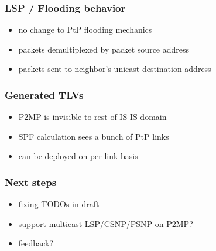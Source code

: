 \documentclass[12pt]{beamer}
\begin{document}
\begin{frame}
  \frametitle{LSP / Flooding behavior}

  \begin{itemize}
    \item {\Large no change to PtP flooding mechanics}
    \item packets demultiplexed by packet source address
    \item packets sent to neighbor's unicast destination address
  \end{itemize}
\end{frame}

\begin{frame}
  \frametitle{Generated TLVs}

  \begin{itemize}
    \item {\Large P2MP is invisible to rest of IS-IS domain}
    \item SPF calculation sees a bunch of PtP links
    \item can be deployed on per-link basis
  \end{itemize}
\end{frame}

\begin{frame}
  \frametitle{Next steps}
  \begin{itemize}
    \item fixing TODOs in draft
    \item support multicast LSP/CSNP/PSNP on P2MP?
    \item feedback?
  \end{itemize}
\end{frame}
\end{document}
